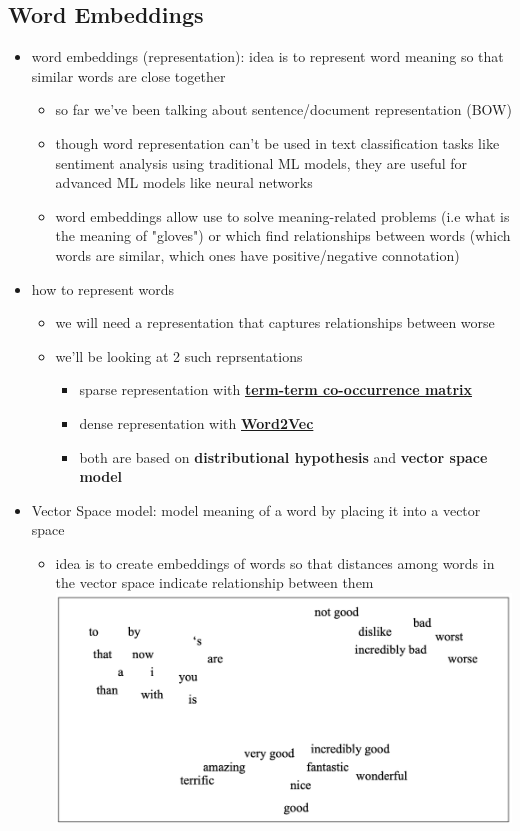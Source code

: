\documentclass[10.5pt,a4paper, fleqn, dvipsnames]{article}
\begin{document}
\subsection*{Word Embeddings}
\begin{itemize}
    \item word embeddings (representation): idea is to represent word meaning so that similar words are close together
    \begin{itemize}
        \item so far we've been talking about sentence/document representation (BOW)
        \item though word representation can't be used in text classification tasks like sentiment analysis using traditional ML models, they are useful for advanced ML models like neural networks 
        \item word embeddings allow use to solve meaning-related problems (i.e what is the meaning of "gloves") or which find relationships between words (which words are similar, which ones have positive/negative connotation)
    \end{itemize}
    \item how to represent words
    \begin{itemize}
        \item we will need a representation that captures relationships between worse 
        \item we'll be looking at 2 such reprsentations
        \begin{itemize}[leftmargin = 2em]
            \item sparse representation with \ul{\textbf{term-term co-occurrence matrix}}
            \item dense representation with \ul{\textbf{Word2Vec}}
            \item both are based on \textbf{distributional hypothesis} and \textbf{vector space model}
        \end{itemize}
    \end{itemize}
    \item Vector Space model: model meaning of a word by placing it into a vector space 
    \begin{itemize}
        \item idea is to create embeddings of words so that distances among words in the vector space indicate relationship between them \\
        \includegraphics[scale = 0.3]{vector-space.png}

\end{itemize}
\end{itemize}
\end{document}
